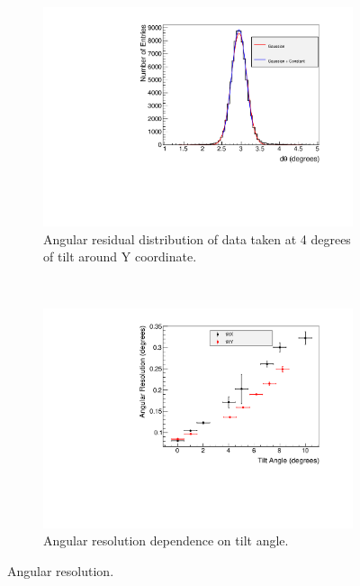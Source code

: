 \documentclass[a4paper,11pt]{article}
\begin{document}
\begin{figure}[h!]
        \centering
         \begin{subfigure}[t]{0.45\textwidth}
   	\includegraphics[keepaspectratio=true, width=\textwidth]{Figures/angularRes_Down.pdf}
	\caption{Angular residual distribution of data taken at 4 degrees of tilt around Y coordinate.}
	\label{ang-residual}
        \end{subfigure}
         ~
         \begin{subfigure}[t]{0.45\textwidth}
        \centering
   	\includegraphics[keepaspectratio=true, width=\textwidth]{Figures/mgr_angres.pdf}
	\caption{Angular resolution dependence on tilt angle.}
                \label{ang-resolution}
        \end{subfigure}
         \caption{Angular resolution.}
        \label{res}
\end{figure}
\end{document}
